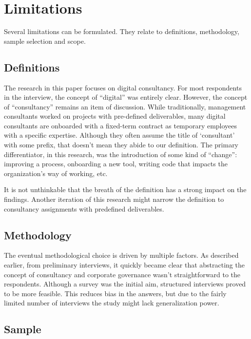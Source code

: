 \documentclass[
  man,floatsintext]{apa6}
\begin{document}
\section{Limitations}\label{limitations}

Several limitations can be formulated. They relate to definitions, methodology, sample selection and scope.

\subsection{Definitions}\label{definitions}

The research in this paper focuses on digital consultancy. For most respondents in the interview, the concept of ``digital'' was entirely clear. However, the concept of ``consultancy'' remains an item of discussion. While traditionally, management consultants worked on projects with pre-defined deliverables, many digital consultants are onboarded with a fixed-term contract as temporary employees with a specific expertise. Although they often assume the title of `consultant' with some prefix, that doesn't mean they abide to our definition. The primary differentiator, in this research, was the introduction of some kind of ``change'': improving a process, onboarding a new tool, writing code that impacts the organization's way of working, etc.

It is not unthinkable that the breath of the definition has a strong impact on the findings. Another iteration of this research might narrow the definition to consultancy assignments with predefined deliverables.

\subsection{Methodology}\label{methodology-1}

The eventual methodological choice is driven by multiple factors. As described earlier, from preliminary interviews, it quickly became clear that abstracting the concept of consultancy and corporate governance wasn't straightforward to the respondents. Although a survey was the initial aim, structured interviews proved to be more feasible. This reduces bias in the answers, but due to the fairly limited number of interviews the study might lack generalization power.

\subsection{Sample}\label{sample}
\end{document}
